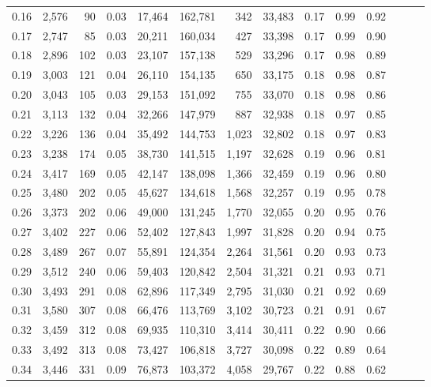 \begin{tabular}{rrrrrrrrrrrrrr}
0.16 &  2,576 &   90 &  0.03 &   17,464 &  162,781 &     342 &  33,483 &  0.17 &  0.99 &      0.92 \\
0.17 &  2,747 &   85 &  0.03 &   20,211 &  160,034 &     427 &  33,398 &  0.17 &  0.99 &      0.90 \\
0.18 &  2,896 &  102 &  0.03 &   23,107 &  157,138 &     529 &  33,296 &  0.17 &  0.98 &      0.89 \\
0.19 &  3,003 &  121 &  0.04 &   26,110 &  154,135 &     650 &  33,175 &  0.18 &  0.98 &      0.87 \\
0.20 &  3,043 &  105 &  0.03 &   29,153 &  151,092 &     755 &  33,070 &  0.18 &  0.98 &      0.86 \\
0.21 &  3,113 &  132 &  0.04 &   32,266 &  147,979 &     887 &  32,938 &  0.18 &  0.97 &      0.85 \\
0.22 &  3,226 &  136 &  0.04 &   35,492 &  144,753 &   1,023 &  32,802 &  0.18 &  0.97 &      0.83 \\
0.23 &  3,238 &  174 &  0.05 &   38,730 &  141,515 &   1,197 &  32,628 &  0.19 &  0.96 &      0.81 \\
0.24 &  3,417 &  169 &  0.05 &   42,147 &  138,098 &   1,366 &  32,459 &  0.19 &  0.96 &      0.80 \\
0.25 &  3,480 &  202 &  0.05 &   45,627 &  134,618 &   1,568 &  32,257 &  0.19 &  0.95 &      0.78 \\
0.26 &  3,373 &  202 &  0.06 &   49,000 &  131,245 &   1,770 &  32,055 &  0.20 &  0.95 &      0.76 \\
0.27 &  3,402 &  227 &  0.06 &   52,402 &  127,843 &   1,997 &  31,828 &  0.20 &  0.94 &      0.75 \\
0.28 &  3,489 &  267 &  0.07 &   55,891 &  124,354 &   2,264 &  31,561 &  0.20 &  0.93 &      0.73 \\
0.29 &  3,512 &  240 &  0.06 &   59,403 &  120,842 &   2,504 &  31,321 &  0.21 &  0.93 &      0.71 \\
0.30 &  3,493 &  291 &  0.08 &   62,896 &  117,349 &   2,795 &  31,030 &  0.21 &  0.92 &      0.69 \\
0.31 &  3,580 &  307 &  0.08 &   66,476 &  113,769 &   3,102 &  30,723 &  0.21 &  0.91 &      0.67 \\
0.32 &  3,459 &  312 &  0.08 &   69,935 &  110,310 &   3,414 &  30,411 &  0.22 &  0.90 &      0.66 \\
0.33 &  3,492 &  313 &  0.08 &   73,427 &  106,818 &   3,727 &  30,098 &  0.22 &  0.89 &      0.64 \\
0.34 &  3,446 &  331 &  0.09 &   76,873 &  103,372 &   4,058 &  29,767 &  0.22 &  0.88 &      0.62 \\

\end{tabular}
